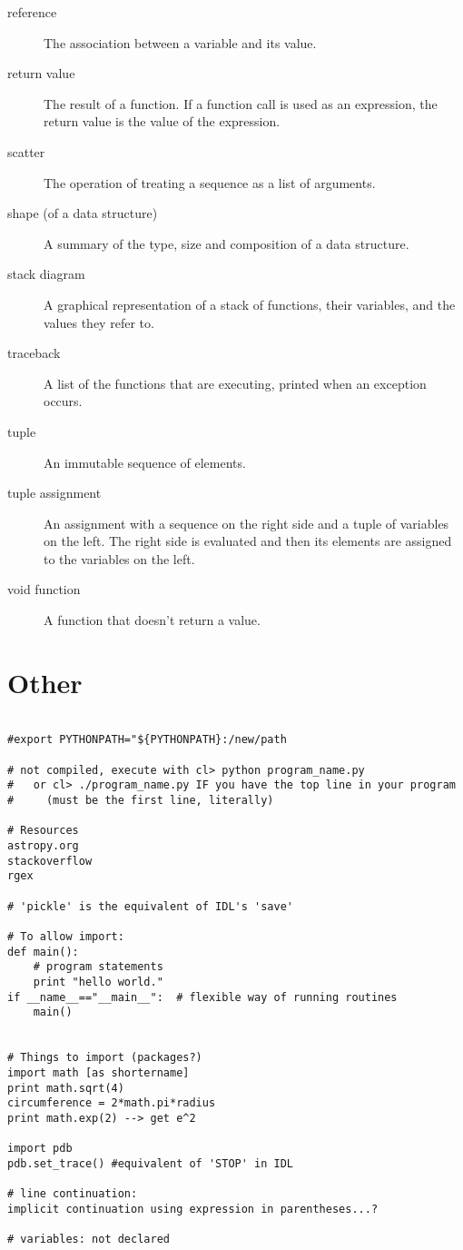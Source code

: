 \documentclass{article}
\begin{document}
\begin{description}
\item [reference] The association between a variable and its value.
\item [return value] The result of a function. If a function call is
    used as an expression, the return value is the value of the
    expression.
\item [scatter] The operation of treating a sequence as a list of
    arguments.
\item [shape (of a data structure)] A summary of the type, size and
    composition of a data structure.
\item [stack diagram] A graphical representation of a stack of
    functions, their variables, and the values they refer to.
\item [traceback] A list of the functions that are executing, printed
    when an exception occurs.
\item [tuple] An immutable sequence of elements.
\item [tuple assignment] An assignment with a sequence on the right
    side and a tuple of variables on the left. The right side is
    evaluated and then its elements are assigned to the variables on
    the left.
\item [void function] A function that doesn't return a value.
\end{description}

\section{Other}

\begin{verbatim}

#export PYTHONPATH="${PYTHONPATH}:/new/path

# not compiled, execute with cl> python program_name.py
#   or cl> ./program_name.py IF you have the top line in your program
#     (must be the first line, literally)

# Resources
astropy.org
stackoverflow
rgex

# 'pickle' is the equivalent of IDL's 'save'

# To allow import:
def main():
    # program statements
    print "hello world."
if __name__=="__main__":  # flexible way of running routines
    main()


# Things to import (packages?)
import math [as shortername]
print math.sqrt(4)
circumference = 2*math.pi*radius
print math.exp(2) --> get e^2

import pdb
pdb.set_trace() #equivalent of 'STOP' in IDL

# line continuation:
implicit continuation using expression in parentheses...?

# variables: not declared
\end{verbatim}
\end{document}
